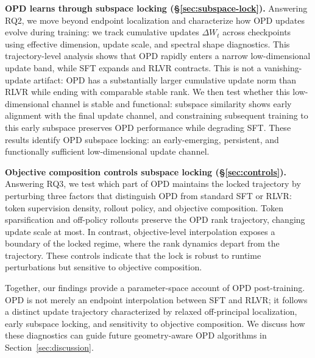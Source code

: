 \textbf{OPD learns through subspace locking
(\S\ref{sec:subspace-lock}).}
Answering RQ2, we move beyond endpoint localization and characterize how
OPD updates evolve during training: we track cumulative updates
$\Delta W_t$ across checkpoints using effective dimension, update scale,
and spectral shape diagnostics. This trajectory-level analysis shows that
OPD rapidly enters a narrow low-dimensional update band, while SFT expands and RLVR contracts. This is not a vanishing-update artifact: OPD has a substantially larger cumulative update norm than RLVR while ending with comparable stable rank. We then test whether this low-dimensional channel is stable and functional: subspace similarity shows early alignment with the final update channel, and constraining subsequent training to this early subspace preserves OPD performance while degrading SFT. These results identify OPD subspace locking: an early-emerging, persistent, and functionally sufficient low-dimensional update channel.

\textbf{Objective composition controls subspace locking
(\S\ref{sec:controls}).}
Answering RQ3, we test which part of OPD maintains the locked trajectory
by perturbing three factors that distinguish OPD from standard SFT or
RLVR: token supervision density, rollout policy, and objective composition.
Token sparsification and off-policy rollouts preserve the OPD rank
trajectory, changing update scale at most. In contrast, objective-level interpolation exposes a boundary of the locked regime, where the rank
dynamics depart from the trajectory. These controls indicate that the lock is robust to runtime perturbations but sensitive to objective composition.


Together, our findings provide a parameter-space account of OPD
post-training. OPD is not merely an endpoint interpolation between SFT and RLVR; it follows a distinct update trajectory characterized by relaxed off-principal localization, early subspace locking, and sensitivity to objective composition. We discuss how these diagnostics can guide future geometry-aware OPD algorithms in Section~\ref{sec:discussion}.


